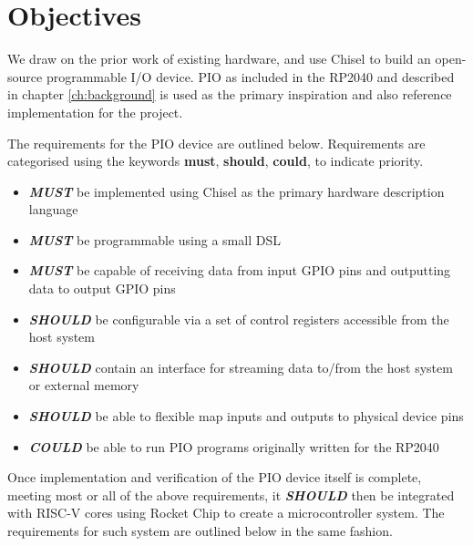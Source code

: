 \chapter{Objectives}
\label{ch:objectives}

We draw on the prior work of existing hardware, and use Chisel to build an open-source programmable I/O device. PIO as included in the RP2040 and described in chapter \ref{ch:background} is used as the primary inspiration and also reference implementation for the project.

The requirements for the PIO device are outlined below. Requirements are categorised using the keywords \textbf{must}, \textbf{should}, \textbf{could}, to indicate priority.

\begin{itemize}
    \item \textit{\textbf{MUST}} be implemented using Chisel as the primary hardware description language
    \item \textit{\textbf{MUST}} be programmable using a small DSL
    \item \textit{\textbf{MUST}} be capable of receiving data from input GPIO pins and outputting data to output GPIO pins
    \item \textit{\textbf{SHOULD}} be configurable via a set of control registers accessible from the host system
    \item \textit{\textbf{SHOULD}} contain an interface for streaming data to/from the host system or external memory
    \item \textit{\textbf{SHOULD}} be able to flexible map inputs and outputs to physical device pins
    \item \textit{\textbf{COULD}} be able to run PIO programs originally written for the RP2040
\end{itemize}

Once implementation and verification of the PIO device itself is complete, meeting most or all of the above requirements, it \textit{\textbf{SHOULD}} then be integrated with RISC-V cores using Rocket Chip to create a microcontroller system. The requirements for such system are outlined below in the same fashion.

